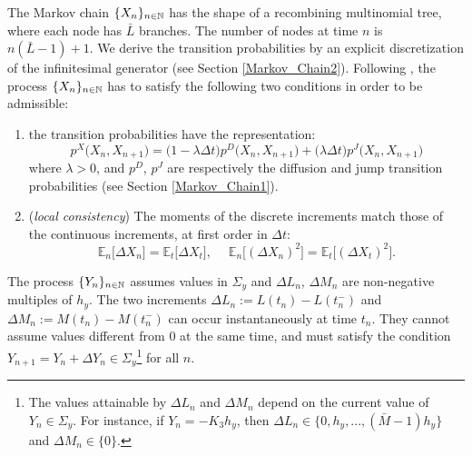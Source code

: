 The Markov chain $\{X_n\}_{n\in \mathbb{N}}$ has the shape of a recombining multinomial tree, where each node has $\bar L$ branches.  
The number of nodes at time $n$ is $n(\bar L-1)+1$.
We derive the transition probabilities by an explicit discretization of the infinitesimal generator (see Section \ref{Markov_Chain2}).
Following \cite{Kushner}, the process $\{X_n\}_{n\in \mathbb{N}}$ has to satisfy the following two conditions in order to be admissible:
\begin{enumerate}
 \item the transition probabilities have the representation:
 \begin{equation}\label{local1}
  p^X \bigl(X_n,X_{n+1}\bigr) = \bigl(1-\lambda \Delta t \bigr) p^{D}\bigl(X_n,X_{n+1}\bigr) + \bigl( \lambda \Delta t \bigr) p^J\bigl(X_n,X_{n+1}\bigr)
 \end{equation}
  where $\lambda > 0$, and $p^{D}$, $p^J$ are respectively the diffusion and jump transition probabilities (see 
  Section \ref{Markov_Chain1}).
 \item (\emph{local consistency}) The moments of the discrete increments match those of the continuous increments, at first order in $\Delta t$: 
\begin{equation}\label{local2}
  \mathbb{E}_n \bigl[ \Delta X_n \bigr] = \mathbb{E}_t \bigl[ \Delta X_t \bigr], \; \quad  %
  \mathbb{E}_n \bigl[ ( \Delta X_n )^2 \bigr] = \mathbb{E}_t \bigl[ ( \Delta X_t )^2 \bigr].  %
\end{equation}
\end{enumerate}

The process $\{Y_n\}_{n\in \mathbb{N}}$ assumes values in $\Sigma_y$ and $\Delta L_n$, $\Delta M_n$ are non-negative multiples of $h_y$.
The two increments $\Delta L_n := L(t_{n}) - L(t_{n}^-)$ and $\Delta M_n := M(t_{n}) - M(t_{n}^-)$ can occur instantaneously at time $t_n$. 
They cannot assume values different from $0$ at the same time, 
and must satisfy the condition $Y_{n+1} = Y_n + \Delta Y_n \in \Sigma_y$\footnote{The values attainable by $\Delta L_n$ and $\Delta M_n$ 
depend on the current value of $Y_n \in \Sigma_y$. 
For instance, if $Y_n = -K_3 h_y$, then $\Delta L_n \in \{0, h_y, ...,(\bar M-1) h_y \}$ and $\Delta M_n \in \{0\}$.} for all $n$.  





